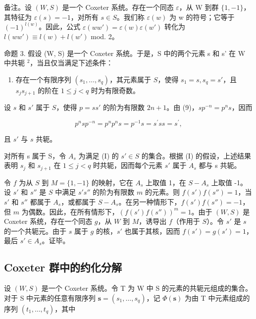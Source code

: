 备注。设 \((W,S)\) 是一个 Coxeter 系统。存在一个同态 \(\varepsilon\)，从 W 到群 \(\{1,-1\}\)，其特征为 \(\varepsilon(s)=-1\)，对所有 \(s\in S\)。我们称 \(\varepsilon(w)\) 为 w 的符号；它等于 \((-1)^{l(w)}\)。因此，公式 \(\varepsilon(ww')=\varepsilon(w)\varepsilon(w')\) 转化为 \(l(ww')\equiv l(w)+l(w')\) mod. 2。

命题 3. 假设 (W, S) 是一个 Coxeter 系统。于是，S 中的两个元素 s 和 s' 在 W 中共轭 \(^{2}\)，当且仅当满足下述条件：

\begin{enumerate}
\def\labelenumi{(\Roman{enumi})}
\tightlist
\item
  存在一个有限序列 \((s_1, \ldots, s_q)\)，其元素属于 \(S\)，使得 \(s_1 = s, s_q = s'\)，且 \(s_j s_{j+1}\) 的阶在 \(1 \leqslant j < q\) 时为有限奇数。
\end{enumerate}

设 \(s\) 和 \(s'\) 属于 \(S\)，使得 \(p = ss'\) 的阶为有限数 \(2n + 1\)。由 (9)，\(sp^{-n} = p^n s\)，因而

\[
p ^ {n} s p ^ {- n} = p ^ {n} p ^ {n} s = p ^ {- 1} s = s ^ {\prime} s s = s ^ {\prime},\tag{10}
\]

且 \(s'\) 与 \(s\) 共轭。

对所有 s 属于 S，令 \(A_{s}\) 为满足 (I) 的 \(s' \in S\) 的集合。根据 (I) 的假设，上述结果表明 \(s_{j}\) 和 \(s_{j+1}\) 在 \(1 \leqslant j < q\) 时共轭，因而每个元素 \(s'\) 属于 \(A_{s}\) 都与 s 共轭。

令 \(f\) 为从 \(S\) 到 \(M = \{1, -1\}\) 的映射，它在 \(A_s\) 上取值 1，在 \(S - A_s\) 上取值 -1。设 \(s'\) 和 \(s''\) 是 \(S\) 中满足 \(s's''\) 的阶为有限数 \(m\) 的元素。则 \(f(s')f(s'') = 1\)，当 \(s'\) 和 \(s''\) 都属于 \(A_s\)，或都属于 \(S - A_s\)。在另一种情形下，\(f(s')f(s'') = -1\)，但 \(m\) 为偶数。因此，在所有情形下，\((f(s')f(s''))^m = 1\)。由于 \((W, S)\) 是 Coxeter 系统，存在一个同态 \(g\)，从 \(W\) 到 \(M\)，诱导出 \(f\)（作用于 \(S\)）。令 \(s'\) 是 \(s\) 的一个共轭元。由于 \(s\) 属于 \(g\) 的核，\(s'\) 也属于其核，因而 \(f(s') = g(s') = 1\)，最后 \(s' \in A_s\)。证毕。

\subsection{Coxeter 群中的约化分解}

设 \((W,S)\) 是一个 Coxeter 系统。令 T 为 W 中 S 的元素的共轭元组成的集合。对于 S 中元素的任意有限序列 \(\mathbf{s}=(s_{1},\ldots,s_{q})\)，记 \(\Phi(\mathbf{s})\) 为由 T 中元素组成的序列 \((t_{1},\ldots,t_{q})\)，其中

